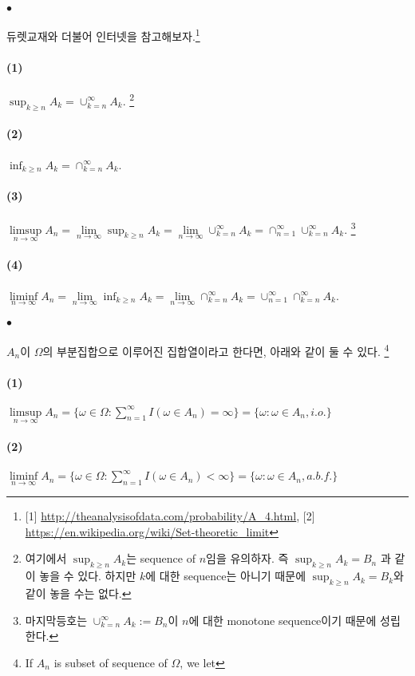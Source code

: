 \documentclass[12pt,oneside,english,a4paper]{article}
\def\ck{\paragraph{\Large$\bullet$}\Large}
\def\one{\paragraph{\Large(1)}\Large}
\def\two{\paragraph{\Large(2)}\Large}
\def\three{\paragraph{\Large(3)}\Large}
\def\four{\paragraph{\Large(4)}\Large}
\begin{document}
\ck 듀렛교재와 더불어 인터넷을 참고해보자.\footnote{[1] \url{http://theanalysisofdata.com/probability/A_4.html}, [2] \url{https://en.wikipedia.org/wiki/Set-theoretic_limit}}
\one $\sup_{k\geq n}A_k=\cup_{k=n}^{\infty}A_k$. \footnote{여기에서 $\sup_{k\geq n}A_k$는 sequence of $n$임을 유의하자. 즉 $\sup_{k\geq n}A_k=B_n$ 과 같이 놓을 수 있다. 하지만 $k$에 대한 sequence는 아니기 때문에 $\sup_{k\geq n}A_k=B_k$와 같이 놓을 수는 없다.}
\two $\inf_{k\geq n}A_k=\cap_{k=n}^{\infty}A_k$. 
\three $\underset{n\to\infty}{\limsup}A_n=\underset{n\to\infty}{\lim}\sup_{k\geq n}A_k=\underset{n\to\infty}{\lim}\cup_{k=n}^{\infty}A_k=\cap_{n=1}^{\infty}\cup_{k=n}^{\infty}A_k$. \footnote{마지막등호는 $\cup_{k=n}^{\infty}A_k:=B_n$이 $n$에 대한 monotone sequence이기 때문에 성립한다.}
\four $\underset{n\to\infty}{\liminf}A_n=\underset{n\to\infty}{\lim}\inf_{k\geq n}A_k=\underset{n\to\infty}{\lim}\cap_{k=n}^{\infty}A_k=\cup_{n=1}^{\infty}\cap_{k=n}^{\infty}A_k$. 

\ck $A_n$이 $\Omega$의 부분집합으로 이루어진 집합열이라고 한다면, 아래와 같이 둘 수 있다. \footnote{If $A_n$ is subset of sequence of $\Omega$, we let}
\one $\underset{n\to\infty}{\limsup}A_n=\bigg\{\omega\in \Omega: \sum_{n=1}^{\infty} I(\omega \in A_n) = \infty\bigg\}=\bigg\{\omega: \omega\in A_n, i.o.\bigg\}$
\two $\underset{n\to\infty}{\liminf}A_n=\bigg\{\omega\in \Omega: \sum_{n=1}^{\infty} I(\omega \in A_n) < \infty\bigg\}=\bigg\{\omega: \omega\in A_n, a.b.f.\bigg\}$
\end{document}
